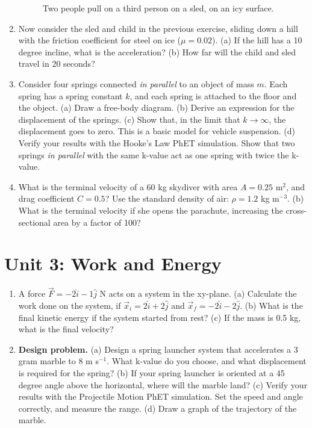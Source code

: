 \documentclass[10pt]{article}
\begin{document}
\begin{enumerate}
\begin{figure}
\caption{\label{fig:3} Two people pull on a third person on a sled, on an icy surface.}
\end{figure}\vspace{2cm}
\item Now consider the sled and child in the previous exercise, sliding down a hill with the friction coefficient for steel on ice ($\mu=0.02$).  (a) If the hill has a 10 degree incline, what is the acceleration? (b) How far will the child and sled travel in 20 seconds? \\ \vspace{3cm}
\item Consider four springs connected \textit{in parallel} to an object of mass $m$.  Each spring has a spring constant $k$, and each spring is attached to the floor and the object. (a) Draw a free-body diagram. (b) Derive an expression for the displacement of the springs. (c) Show that, in the limit that $k \to \infty$, the displacement goes to zero.  This is a basic model for vehicle suspension. (d) Verify your results with the Hooke's Law PhET simulation.  Show that two springs \textit{in parallel} with the same k-value act as one spring with twice the k-value.  \\ \vspace{4cm}
\item What is the terminal velocity of a 60 kg skydiver with area $A = 0.25$ m$^2$, and drag coefficient $C = 0.5$?  Use the standard density of air: $\rho = 1.2$ kg m$^{-3}$. (b) What is the terminal velocity if she opens the parachute, increasing the cross-sectional area by a factor of 100? \\ \vspace{3cm}
\end{enumerate}

\section{Unit 3: Work and Energy}

\begin{enumerate}
\item A force $\vec{F} = -2\hat{i} - 1\hat{j}$ N acts on a system in the xy-plane.  (a) Calculate the work done on the system, if $\vec{x}_i = 2\hat{i} + 2\hat{j}$ and $\vec{x}_f = -2\hat{i} - 2\hat{j}$. (b) What is the final kinetic energy if the system started from rest?  (c) If the mass is 0.5 kg, what is the final velocity? \\ \vspace{4cm}
\item \textbf{Design problem.} (a) Design a spring launcher system that accelerates a 3 gram marble to 8 m s$^{-1}$.  What k-value do you choose, and what displacement is required for the spring? (b) If your spring launcher is oriented at a 45 degree angle above the horizontal, where will the marble land? (c) Verify your results with the Projectile Motion PhET simulation.  Set the speed and angle correctly, and measure the range. (d) Draw a graph of the trajectory of the marble.
\end{enumerate}
\end{document}
